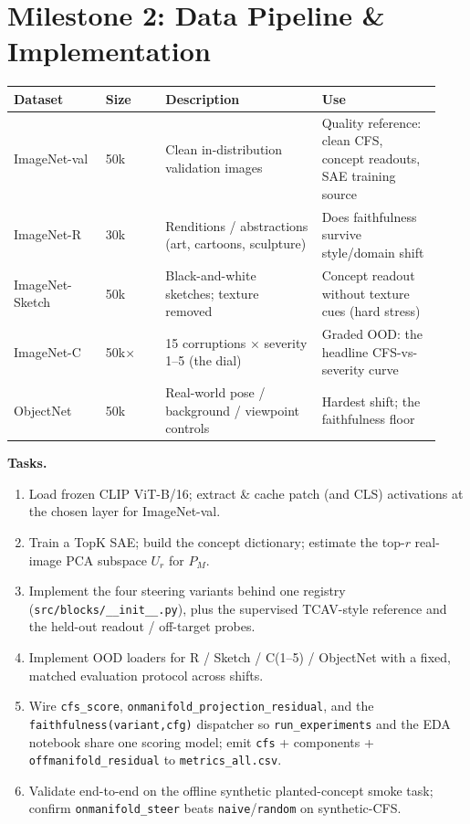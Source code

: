 \documentclass[11pt]{article}
\begin{document}
\section{Milestone 2: Data Pipeline \& Implementation}

\renewcommand{\arraystretch}{1.2}
\begin{center}\small
\begin{tabular}{@{}p{0.20\linewidth} p{0.13\linewidth} p{0.34\linewidth} p{0.26\linewidth}@{}}
\toprule
\textbf{Dataset} & \textbf{Size} & \textbf{Description} & \textbf{Use}\\
\midrule
ImageNet-val & 50k & Clean in-distribution validation images & Quality reference: clean
  CFS, concept readouts, SAE training source\\
ImageNet-R & 30k & Renditions / abstractions (art, cartoons, sculpture) & Does
  faithfulness survive style/domain shift\\
ImageNet-Sketch & 50k & Black-and-white sketches; texture removed & Concept readout
  without texture cues (hard stress)\\
ImageNet-C & 50k$\times$ & 15 corruptions $\times$ severity 1--5 (the dial) & Graded
  OOD: the headline CFS-vs-severity curve\\
ObjectNet & 50k & Real-world pose / background / viewpoint controls & Hardest shift;
  the faithfulness floor\\
\bottomrule
\end{tabular}
\end{center}

\textbf{Tasks.}
\begin{enumerate}[leftmargin=1.5em,itemsep=1pt]
  \item Load frozen CLIP ViT-B/16; extract \& cache patch (and CLS) activations at the
    chosen layer for ImageNet-val.
  \item Train a TopK SAE; build the concept dictionary; estimate the top-$r$ real-image
    PCA subspace $U_r$ for $P_M$.
  \item Implement the four steering variants behind one registry
    (\texttt{src/blocks/\_\_init\_\_.py}), plus the supervised TCAV-style reference and
    the held-out readout / off-target probes.
  \item Implement OOD loaders for R / Sketch / C(1--5) / ObjectNet with a fixed, matched
    evaluation protocol across shifts.
  \item Wire \texttt{cfs\_score}, \texttt{onmanifold\_projection\_residual}, and the
    \texttt{faithfulness(variant,cfg)} dispatcher so \texttt{run\_experiments} and the EDA
    notebook share one scoring model; emit \texttt{cfs} + components +
    \texttt{offmanifold\_residual} to \texttt{metrics\_all.csv}.
  \item Validate end-to-end on the offline synthetic planted-concept smoke task; confirm
    \texttt{onmanifold\_steer} beats \texttt{naive}/\texttt{random} on synthetic-CFS.
\end{enumerate}
\end{document}
